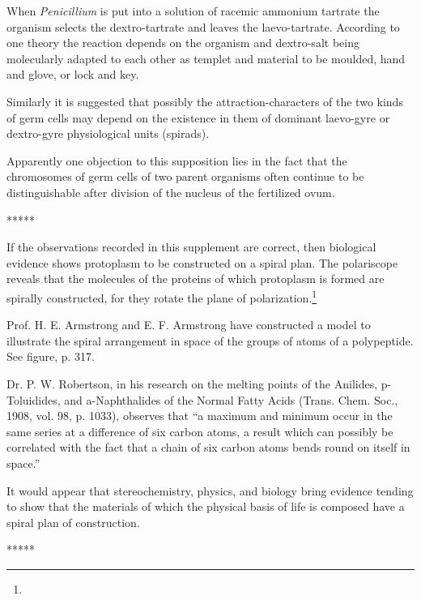 \documentclass[a4paper, 12pt, oneside]{article}
\begin{document}
When \emph{Penicillium} is put into a solution of racemic ammonium tartrate the organism selects the dextro-tartrate and leaves the laevo-tartrate. According to one theory the reaction depends on the organism and dextro-salt being molecularly adapted to each other as templet and material to be moulded, hand and glove, or lock and key.

Similarly it is suggested that possibly the attraction-characters of the two kinds of germ cells may depend on the existence in them of dominant laevo-gyre or dextro-gyre physiological units (spirads).

Apparently one objection to this supposition lies in the fact that the chromosomes of germ cells of two parent organisms often continue to be distinguishable after division of the nucleus of the fertilized ovum.

\centerline{*\hspace{15mm}*\hspace{15mm}*\hspace{15mm}*\hspace{15mm}*}
\bigskip

If the observations recorded in this supplement are correct, then biological evidence shows protoplasm to be constructed on a spiral plan. The polariscope reveals that the molecules of the proteins of which protoplasm is formed are spirally constructed, for they rotate the plane of polarization.\footnote{}

Prof. H. E. Armstrong and E. F. Armstrong have constructed a model to illustrate the spiral arrangement in space of the groups of atoms of a polypeptide. See figure, p. 317.

Dr. P. W. Robertson, in his research on the melting points of the Anilides, p-Toluidides, and a-Naphthalides of the Normal Fatty Acids (Trans. Chem. Soc., 1908, vol. 98, p. 1033), observes that ``a maximum and minimum occur in the same series at a difference of six carbon atoms, a result which can possibly be correlated with the fact that a chain of six carbon atoms bends round on itself in space.''

It would appear that stereochemistry, physics, and biology bring evidence tending to show that the materials of which the physical basis of life is composed have a spiral plan of construction.

\centerline{*\hspace{15mm}*\hspace{15mm}*\hspace{15mm}*\hspace{15mm}*}
\bigskip
\end{document}
